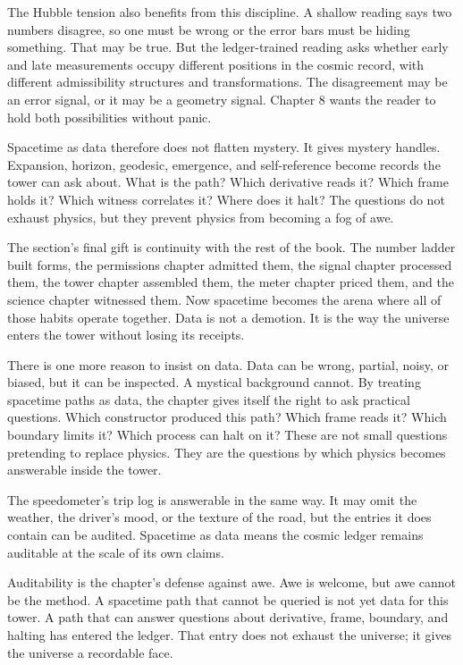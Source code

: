 The Hubble tension also benefits from this discipline. A shallow reading says
two numbers disagree, so one must be wrong or the error bars must be hiding
something. That may be true. But the ledger-trained reading asks whether early
and late measurements occupy different positions in the cosmic record, with
different admissibility structures and transformations. The disagreement may
be an error signal, or it may be a geometry signal. Chapter 8 wants the reader
to hold both possibilities without panic.

Spacetime as data therefore does not flatten mystery. It gives mystery handles.
Expansion, horizon, geodesic, emergence, and self-reference become records the
tower can ask about. What is the path? Which derivative reads it? Which frame
holds it? Which witness correlates it? Where does it halt? The questions do
not exhaust physics, but they prevent physics from becoming a fog of awe.

The section's final gift is continuity with the rest of the book. The number
ladder built forms, the permissions chapter admitted them, the signal chapter
processed them, the tower chapter assembled them, the meter chapter priced
them, and the science chapter witnessed them. Now spacetime becomes the arena
where all of those habits operate together. Data is not a demotion. It is the
way the universe enters the tower without losing its receipts.

There is one more reason to insist on data. Data can be wrong, partial, noisy,
or biased, but it can be inspected. A mystical background cannot. By treating
spacetime paths as data, the chapter gives itself the right to ask practical
questions. Which constructor produced this path? Which frame reads it? Which
boundary limits it? Which process can halt on it? These are not small questions
pretending to replace physics. They are the questions by which physics becomes
answerable inside the tower.

The speedometer's trip log is answerable in the same way. It may omit the
weather, the driver's mood, or the texture of the road, but the entries it does
contain can be audited. Spacetime as data means the cosmic ledger remains
auditable at the scale of its own claims.

Auditability is the chapter's defense against awe. Awe is welcome, but awe
cannot be the method. A spacetime path that cannot be queried is not yet data
for this tower. A path that can answer questions about derivative, frame,
boundary, and halting has entered the ledger. That entry does not exhaust the
universe; it gives the universe a recordable face.

